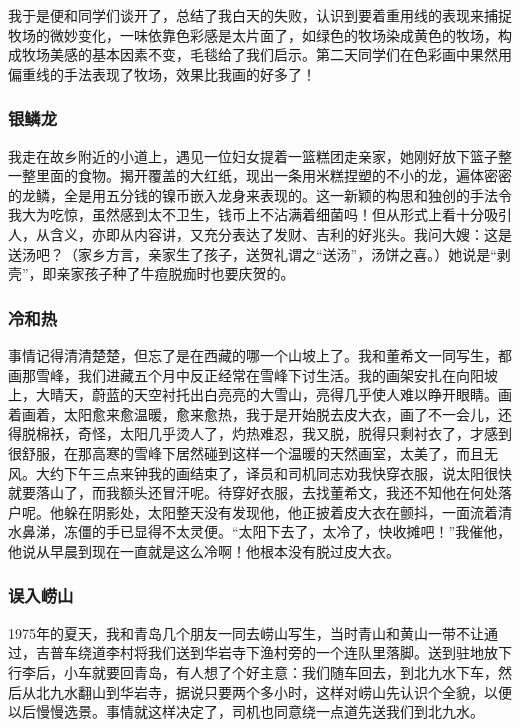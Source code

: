 \documentclass{article}
\begin{document}
我于是便和同学们谈开了，总结了我白天的失败，认识到要着重用线的表现来捕捉牧场的微妙变化，一味依靠色彩感是太片面了，如绿色的牧场染成黄色的牧场，构成牧场美感的基本因素不变，毛毯给了我们启示。第二天同学们在色彩画中果然用偏重线的手法表现了牧场，效果比我画的好多了！
\subsubsection{银鳞龙}
我走在故乡附近的小道上，遇见一位妇女提着一篮糕团走亲家，她刚好放下篮子整一整里面的食物。揭开覆盖的大红纸，现出一条用米糕捏塑的不小的龙，遍体密密的龙鳞，全是用五分钱的镍币嵌入龙身来表现的。这一新颖的构思和独创的手法令我大为吃惊，虽然感到太不卫生，钱币上不沾满着细菌吗！但从形式上看十分吸引人，从含义，亦即从内容讲，又充分表达了发财、吉利的好兆头。我问大嫂：这是送汤吧？（家乡方言，亲家生了孩子，送贺礼谓之“送汤”，汤饼之喜。）她说是“剥壳”，即亲家孩子种了牛痘脱痂时也要庆贺的。
\subsubsection{冷和热}
事情记得清清楚楚，但忘了是在西藏的哪一个山坡上了。我和董希文一同写生，都画那雪峰，我们进藏五个月中反正经常在雪峰下讨生活。我的画架安扎在向阳坡上，大晴天，蔚蓝的天空衬托出白亮亮的大雪山，亮得几乎使人难以睁开眼睛。画着画着，太阳愈来愈温暖，愈来愈热，我于是开始脱去皮大衣，画了不一会儿，还得脱棉袄，奇怪，太阳几乎烫人了，灼热难忍，我又脱，脱得只剩衬衣了，才感到很舒服，在那高寒的雪峰下居然碰到这样一个温暖的天然画室，太美了，而且无风。大约下午三点来钟我的画结束了，译员和司机同志劝我快穿衣服，说太阳很快就要落山了，而我额头还冒汗呢。待穿好衣服，去找董希文，我还不知他在何处落户呢。他躲在阴影处，太阳整天没有发现他，他正披着皮大衣在颤抖，一面流着清水鼻涕，冻僵的手已显得不太灵便。“太阳下去了，太冷了，快收摊吧！”我催他，他说从早晨到现在一直就是这么冷啊！他根本没有脱过皮大衣。
\subsubsection{误入崂山}
1975年的夏天，我和青岛几个朋友一同去崂山写生，当时青山和黄山一带不让通过，吉普车绕道李村将我们送到华岩寺下渔村旁的一个连队里落脚。送到驻地放下行李后，小车就要回青岛，有人想了个好主意：我们随车回去，到北九水下车，然后从北九水翻山到华岩寺，据说只要两个多小时，这样对崂山先认识个全貌，以便以后慢慢选景。事情就这样决定了，司机也同意绕一点道先送我们到北九水。
\end{document}
